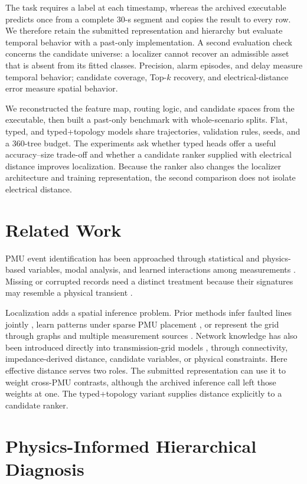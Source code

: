 \documentclass[conference]{IEEEtran}
\begin{document}
The task requires a label at each timestamp, whereas the archived executable predicts once from a complete 30-s segment and copies the result to every row. We therefore retain the submitted representation and hierarchy but evaluate temporal behavior with a past-only implementation. A second evaluation check concerns the candidate universe: a localizer cannot recover an admissible asset that is absent from its fitted classes. Precision, alarm episodes, and delay measure temporal behavior; candidate coverage, Top-$k$ recovery, and electrical-distance error measure spatial behavior.

We reconstructed the feature map, routing logic, and candidate spaces from the executable, then built a past-only benchmark with whole-scenario splits. Flat, typed, and typed+topology models share trajectories, validation rules, seeds, and a 360-tree budget. The experiments ask whether typed heads offer a useful accuracy--size trade-off and whether a candidate ranker supplied with electrical distance improves localization. Because the ranker also changes the localizer architecture and training representation, the second comparison does not isolate electrical distance.

\section{Related Work}
PMU event identification has been approached through statistical and physics-based variables, modal analysis, and learned interactions among measurements \cite{pandey2020,taghipour2023,yuan2023gnn}. Missing or corrupted records need a distinct treatment because their signatures may resemble a physical transient \cite{yuan2021,liu2023}.

Localization adds a spatial inference problem. Prior methods infer faulted lines jointly \cite{li2019}, learn patterns under sparse PMU placement \cite{yildiz2024}, or represent the grid through graphs and multiple measurement sources \cite{ahmed2024,ganjkhani2024}. Network knowledge has also been introduced directly into transmission-grid models \cite{li2024knowledge}, through connectivity, impedance-derived distance, candidate variables, or physical constraints. Here effective distance serves two roles. The submitted representation can use it to weight cross-PMU contrasts, although the archived inference call left those weights at one. The typed+topology variant supplies distance explicitly to a candidate ranker.

\section{Physics-Informed Hierarchical Diagnosis}
\end{document}
